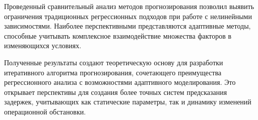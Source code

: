 Проведенный сравнительный анализ методов прогнозирования позволил выявить ограничения традиционных регрессионных подходов при работе с нелинейными зависимостями.
Наиболее перспективными представляются адаптивные методы, способные учитывать комплексное взаимодействие множества факторов в изменяющихся условиях.

Полученные результаты создают теоретическую основу для разработки итеративного алгоритма прогнозирования, сочетающего преимущества регрессионного анализа с возможностями адаптивного моделирования.
Это открывает перспективы для создания более точных систем предсказания задержек, учитывающих как статические параметры, так и динамику изменений операционной обстановки.